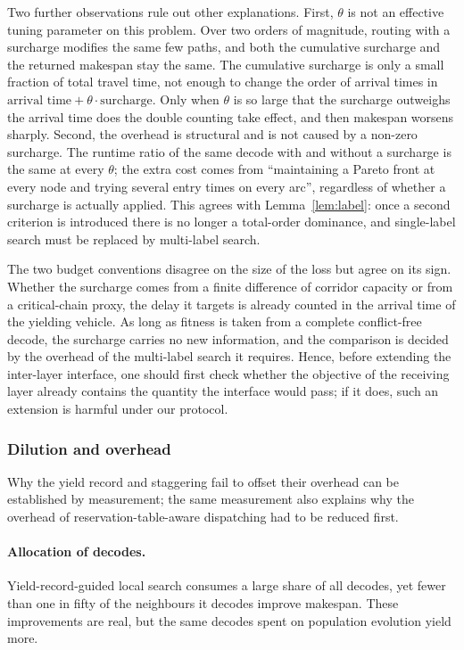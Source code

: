 Two further observations rule out other explanations. First, $\theta$ is not an effective tuning parameter on this problem. Over two orders of magnitude, routing with a surcharge modifies the same few paths, and both the cumulative surcharge and the returned makespan stay the same. The cumulative surcharge is only a small fraction of total travel time, not enough to change the order of arrival times in $\text{arrival time}+\theta\cdot\text{surcharge}$. Only when $\theta$ is so large that the surcharge outweighs the arrival time does the double counting take effect, and then makespan worsens sharply.
Second, the overhead is structural and is not caused by a non-zero surcharge. The runtime ratio of the same decode with and without a surcharge is the same at every $\theta$; the extra cost comes from ``maintaining a Pareto front at every node and trying several entry times on every arc'', regardless of whether a surcharge is actually applied. This agrees with Lemma~\ref{lem:label}: once a second criterion is introduced there is no longer a total-order dominance, and single-label search must be replaced by multi-label search.

The two budget conventions disagree on the size of the loss but agree on its sign. Whether the surcharge comes from a finite difference of corridor capacity or from a critical-chain proxy, the delay it targets is already counted in the arrival time of the yielding vehicle. As long as fitness is taken from a complete conflict-free decode, the surcharge carries no new information, and the comparison is decided by the overhead of the multi-label search it requires.
Hence, before extending the inter-layer interface, one should first check whether the objective of the receiving layer already contains the quantity the interface would pass; if it does, such an extension is harmful under our protocol.

\subsubsection{Dilution and overhead}
\label{sec:whycost}

Why the yield record and staggering fail to offset their overhead can be established by measurement; the same measurement also explains why the overhead of reservation-table-aware dispatching had to be reduced first.

\paragraph{Allocation of decodes.}
Yield-record-guided local search consumes a large share of all decodes, yet fewer than one in fifty of the neighbours it decodes improve makespan. These improvements are real, but the same decodes spent on population evolution yield more.

